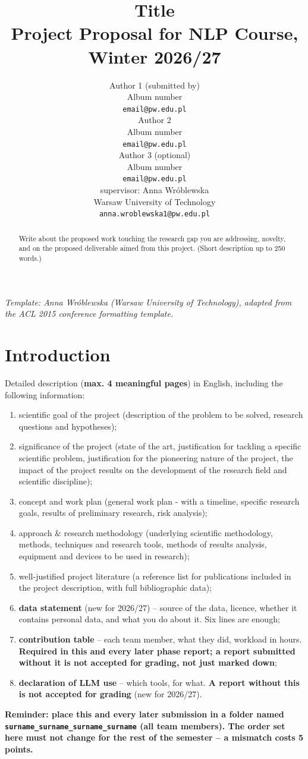 \documentclass[11pt]{article}
\title{Title\\Project Proposal for NLP Course, Winter 2026/27}
\author{Author 1 (submitted by) \\
  Album number \\
  {\tt email@pw.edu.pl} \\\And
  Author 2 \\
  Album number \\
  {\tt email@pw.edu.pl} \\ \And
  Author 3 (optional) \\
  Album number \\
  {\tt email@pw.edu.pl} \\ \AND
  supervisor: Anna Wróblewska\\
  Warsaw University of Technology \\
  {\tt anna.wroblewska1@pw.edu.pl}}
\date{}
\begin{document}
\maketitle

{\small\em Template: Anna Wróblewska (Warsaw University of Technology), adapted from the ACL 2015 conference formatting template.}
\vspace{4pt}

\begin{abstract}
  Write about the proposed work touching the research gap you are addressing, novelty, and on the proposed deliverable aimed from this project.
  (Short description up to 250 words.)
\end{abstract}

\section{Introduction}
Detailed description (\textbf{max. 4 meaningful pages}) in English, including the following information:
\begin{enumerate}
\item scientific goal of the project (description of the problem to be solved, research questions and hypotheses);
\item significance of the project (state of the art, justification for tackling a specific scientific problem, justification for the pioneering nature of the project, the impact of the project results on the development of the research field and scientific discipline);
\item concept and work plan (general work plan - with a timeline, specific research goals, results of preliminary research, risk analysis);
\item approach \& research methodology (underlying scientific methodology, methods, techniques and research tools, methods of results analysis, equipment and devices to be used in research);
\item well-justified project literature (a reference list for publications included in the project description, with full bibliographic data);
\item \textbf{data statement} (new for 2026/27) -- source of the data, licence, whether it contains personal data, and what you do about it. Six lines are enough;
\item \textbf{contribution table} -- each team member, what they did, workload in hours. \textbf{Required in this and every later phase report; a report submitted without it is not accepted for grading, not just marked down};
\item \textbf{declaration of LLM use} -- which tools, for what. \textbf{A report without this is not accepted for grading} (new for 2026/27).
\end{enumerate}

\textbf{Reminder: place this and every later submission in a folder named \texttt{surname\_surname\_surname\_surname} (all team members). The order set here must not change for the rest of the semester -- a mismatch costs 5 points.}



\end{document}
